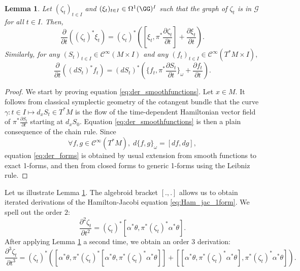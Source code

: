 \documentclass[a4paper,11pt]{article}
\newcommand{\func}[1]{\mathcal{C}^{\infty}(#1)}
\newtheorem{lemma}[theorem]{Lemma}
\begin{document}
\begin{lemma}\label{lemma: time_der}
Let $(\zeta_t)_{t \in I}$ and $(\xi_t)_{t \in I} \in \Omega^1(\GG)^I$ such that the graph of $\zeta_t$ is in $\mathcal{G}$ for all $t \in I.$ Then,
\begin{equation}\label{eq:der_forms}
\frac{\partial}{\partial t} \left((\zeta_t)^* \xi_t \right) = (\zeta_t)^* \left([\xi_t, \pi^* \frac{\partial \zeta_t}{\partial t}] +  \frac{\partial \xi_t}{\partial t}\right).
\end{equation}
Similarly, for any $(S_t)_{t \in I} \in \func{M \times I}$ and any $(f_t)_{t \in I} \in \func{T^*M \times I},$
\begin{equation}\label{eq:der_smoothfunctions}
\frac{\partial}{\partial t} \left((dS_t)^*f_t \right) = (dS_t)^* \left(\{f_t, \pi^* \frac{\partial S_t}{\partial t}\}_{\omega} + \frac{\partial f_t}{\partial t}\right).
\end{equation}
\end{lemma}

\begin{proof}
We start by proving equation \eqref{eq:der_smoothfunctions}. Let $x \in M.$ It follows from classical symplectic geometry of the cotangent bundle that the curve $\gamma \colon t \in I \mapsto d_x S_t \in T^*M$ is the flow of the time-dependent Hamiltonian vector field of $\pi^*\frac{\partial S_t}{\partial t}$ starting at $d_x S_0.$ Equation \eqref{eq:der_smoothfunctions} is then a plain consequence of the chain rule.
Since
\[
\forall f,g \in \func{T^*M}, \; d\{f,g\}_{\omega} = [df, dg],
\]
equation \eqref{eq:der_forms} is obtained by usual extension from smooth functions to exact 1-forms, and then from closed forms to generic 1-forms using the Leibniz rule. 
\end{proof}

Let us illustrate Lemma \ref{lemma: time_der}. The algebroid bracket $[.,.]$ allows us to obtain iterated derivations of the Hamilton-Jacobi equation \eqref{eq:Ham_jac_1form}. We spell out the order $2:$
\begin{equation}\label{eq:der_order2}
\frac{\partial^2 \zeta_t}{\partial t^2} = (\zeta_t)^*[\alpha^*\theta, \pi^* (\zeta_t)^* \alpha^* \theta].
\end{equation}
After applying Lemma \ref{lemma: time_der} a second time, we obtain an order $3$ derivation:
\begin{equation}\label{eq:der_order3}
\frac{\partial^3 \zeta_t}{\partial t^3} = (\zeta_t)^*\left([\alpha^*\theta, \pi^* (\zeta_t)^* [\alpha^* \theta, \pi^* (\zeta_t)^*\alpha^* \theta]] + [[\alpha^*\theta, \pi^* (\zeta_t)^* \alpha^* \theta], \pi^* (\zeta_t)^*\alpha^* \theta] \right).
\end{equation}
\end{document}
